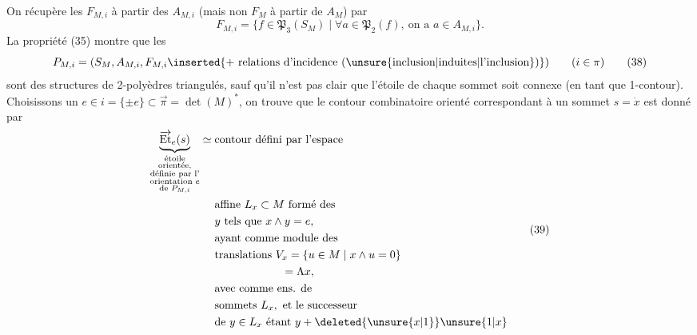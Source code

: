 On récupère les $F_{M,i}$ à partir des $A_{M,i}$
(mais non $F_M$ à partir de $A_M$) par
\[
F_{M,i}=\{f\in\mathfrak P_3(S_M)\mid\forall a\in\mathfrak P_2(f),\ \text{on a }a\in A_{M,i}\}.\tag*{(37)}
\]
La propriété (35) montre que les 
\[
P_{M,i}=(S_M,A_{M,i},F_{M,i}\inserted{+\text{ relations d'incidence (\unsure{inclusion|induites|l'inclusion})}})\qquad(i\in\pi)\tag*{(38)}
\]
sont des structures de 2-polyèdres triangulés, sauf qu'il n'est pas clair que l'étoile de chaque sommet soit connexe
(en tant que 1-contour). Choisissons
un $e\in i=\{\pm e\}\subset\overrightarrow\pi=\det(M)^*$, on
trouve que le contour combinatoire orienté
correspondant à un sommet $s=\dot x$ est
donné par
\[
\begin{aligned}
\underbrace{\overrightarrow{\mathrm{Et}}_e(s)}_{\substack{\text{étoile}\\\text{orientée,}\\\text{définie par l'}\\\text{orientation }e\\\text{de }P_{M,i}}}
\simeq{}&\text{contour défini par l'espace}\\
&\text{affine }L_x\subset M\ \text{formé des}\\
&y\text{ tels que }x\wedge y=e,\\
&\text{ayant comme module des}\\
&\text{translations }V_x=\{u\in M\mid x\wedge u=0\}\\
&\hspace{6em}=\Lambda x,\\
&\text{avec comme ens. de}\\
&\text{sommets }L_x,\ \text{et le successeur}\\
&\text{de }y\in L_x\text{ étant }y+\deleted{\unsure{x|1}}\unsure{1|x}
\end{aligned}\tag*{(39)}
\]

